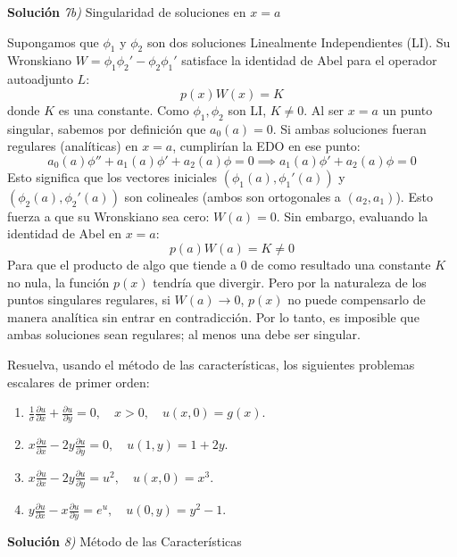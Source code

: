 \documentclass[11pt,spanish]{article}
\newcounter{problema}
\newcommand{\prob}{\stepcounter{problema} \vspace{.5cm} \noindent{\bf Problema \arabic{problema}: }}
\begin{document}
\vspace{0.5cm}
{\bf Soluci\'on }{\em 7b)}
Singularidad de soluciones en $x=a$
\vspace{0.5cm}

Supongamos que $\phi_1$ y $\phi_2$ son dos soluciones Linealmente Independientes (LI).
Su Wronskiano $W = \phi_1 \phi_2' - \phi_2 \phi_1'$ satisface la identidad de Abel para el operador autoadjunto $L$:
$$p(x) W(x) = K$$
donde $K$ es una constante. Como $\phi_1, \phi_2$ son LI, $K \neq 0$.
Al ser $x=a$ un punto singular, sabemos por definición que $a_0(a)=0$.
Si ambas soluciones fueran regulares (analíticas) en $x=a$, cumplirían la EDO en ese punto:
$$a_0(a)\phi'' + a_1(a)\phi' + a_2(a)\phi = 0 \implies a_1(a)\phi' + a_2(a)\phi = 0$$
Esto significa que los vectores iniciales $(\phi_1(a), \phi_1'(a))$ y $(\phi_2(a), \phi_2'(a))$ son colineales (ambos son ortogonales a $(a_2, a_1)$). Esto fuerza a que su Wronskiano sea cero: $W(a) = 0$.
Sin embargo, evaluando la identidad de Abel en $x=a$:
$$p(a) W(a) = K \neq 0$$
Para que el producto de algo que tiende a $0$ de como resultado una constante $K$ no nula, la función $p(x)$ tendría que divergir. Pero por la naturaleza de los puntos singulares regulares, si $W(a) \to 0$, $p(x)$ no puede compensarlo de manera analítica sin entrar en contradicción. Por lo tanto, es imposible que ambas soluciones sean regulares; al menos una debe ser singular.


\prob Resuelva, usando el método de las características, los siguientes problemas escalares de primer orden:
\begin{enumerate}
\item $\displaystyle \frac{1}{\sigma}\frac{\partial u}{\partial x} + \frac{\partial u}{\partial y} = 0,\quad x>0,\quad u(x,0)=g(x).$
\item $\displaystyle x\frac{\partial u}{\partial x} - 2y\frac{\partial u}{\partial y} = 0,\quad u(1,y)=1+2y.$
\item $\displaystyle x\frac{\partial u}{\partial x} - 2y\frac{\partial u}{\partial y} = u^2,\quad u(x,0)=x^3.$
\item $\displaystyle y\frac{\partial u}{\partial x} - x\frac{\partial u}{\partial y} = e^{u},\quad u(0,y)=y^2-1.$
\end{enumerate}

\vspace{0.5cm}
{\bf Soluci\'on }{\em 8)}
Método de las Características
\vspace{0.5cm}
\end{document}
